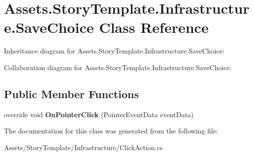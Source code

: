 \hypertarget{classAssets_1_1StoryTemplate_1_1Infrastructure_1_1SaveChoice}{}\section{Assets.\+Story\+Template.\+Infrastructure.\+Save\+Choice Class Reference}
\label{classAssets_1_1StoryTemplate_1_1Infrastructure_1_1SaveChoice}


Inheritance diagram for Assets.\+Story\+Template.\+Infrastructure.\+Save\+Choice\+:


Collaboration diagram for Assets.\+Story\+Template.\+Infrastructure.\+Save\+Choice\+:
\subsection*{Public Member Functions}
\begin{DoxyCompactItemize}
\item 
override void {\bfseries On\+Pointer\+Click} (Pointer\+Event\+Data event\+Data)\hypertarget{classAssets_1_1StoryTemplate_1_1Infrastructure_1_1SaveChoice_a6766418f8357d9364f37f68bdf6ee19f}{}\label{classAssets_1_1StoryTemplate_1_1Infrastructure_1_1SaveChoice_a6766418f8357d9364f37f68bdf6ee19f}

\end{DoxyCompactItemize}


The documentation for this class was generated from the following file\+:\begin{DoxyCompactItemize}
\item 
Assets/\+Story\+Template/\+Infrastructure/Click\+Action.\+cs\end{DoxyCompactItemize}
